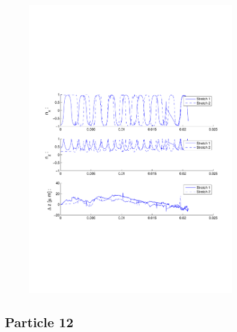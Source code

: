 \begin{figure}[H]

\centering

\includegraphics[width=0.8\textwidth]{Images/Particle 10/Stretch1.pdf}

\end{figure}

\subsection{Particle 12}

